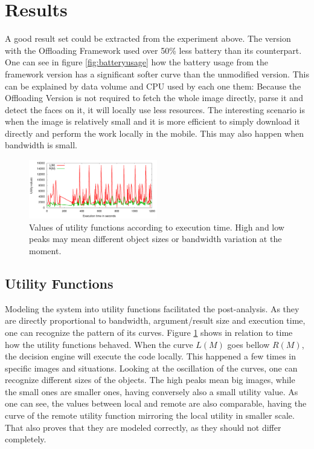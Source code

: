 \documentclass[10pt, conference, letterpaper]{IEEEtran}
\begin{document}
  \section{Results}

  A good result set could be extracted from the experiment above. The version with the Offloading Framework used over 50\% less battery than its counterpart. One can see in figure \ref{fig:batteryusage} how the battery usage from the framework version has a significant softer curve than the unmodified version. This can be explained by data volume and CPU used by each one them: Because the Offloading Version is not required to fetch the whole image directly, parse it and detect the faces on it, it will locally use less resources. The interesting scenario is when the image is relatively small and it is more efficient to simply download it directly and perform the work locally in the mobile. This may also happen when bandwidth is small.

\begin{figure}[!t]
  \centering
  \includegraphics[width=0.5\textwidth]{results/plots/utility-fluctuation/executions.png}
  \caption{Values of utility functions according to execution time. High and low peaks may mean different object sizes or bandwidth variation at the moment.}
  \label{fig:utilityplot}
\end{figure}

  \subsection{Utility Functions}
  Modeling the system into utility functions facilitated the post-analysis. As they are directly proportional to bandwidth, argument/result size and execution time, one can recognize the pattern of its curves. Figure \ref{fig:utilityplot} shows in relation to time how the utility functions behaved. When the curve $L(M)$ goes bellow $R(M)$, the decision engine will execute the code locally. This happened a few times in specific images and situations. Looking at the oscillation of the curves, one can recognize different sizes of the objects. The high peaks mean big images, while the small ones are smaller ones, having conversely also a small utility value. As one can see, the values between local and remote are also comparable, having the curve of the remote utility function mirroring the local utility in smaller scale. That also proves that they are modeled correctly, as they should not differ completely.
\end{document}
